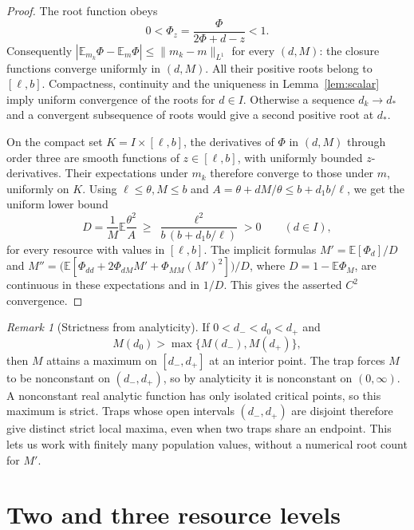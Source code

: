 \documentclass[11pt]{article}
\theoremstyle{remark}
\newtheorem{remark}[theorem]{Remark}
\newcommand{\E}{\mathbb E}
\begin{document}
\begin{proof}
The root function obeys
\[
 0<\Phi_z=\frac{\Phi}{2\Phi+d-z}<1.
\]
Consequently \(|\E_{m_k}\Phi-\E_m\Phi|\le\|m_k-m\|_{L^1}\) for every
\((d,M)\): the closure functions converge uniformly in \((d,M)\). All
their positive roots belong to \([\ell,b]\). Compactness, continuity and
the uniqueness in Lemma~\ref{lem:scalar} imply uniform convergence of the
roots for \(d\in I\). Otherwise a sequence \(d_k\to d_*\) and a convergent
subsequence of roots would give a second positive root at \(d_*\).

On the compact set \(K=I\times[\ell,b]\), the derivatives of \(\Phi\) in
\((d,M)\) through order three are smooth functions of \(z\in[\ell,b]\),
with uniformly bounded \(z\)-derivatives. Their expectations under \(m_k\)
therefore converge to those under \(m\), uniformly on \(K\). Using
\(\ell\le\theta,M\le b\) and \(A=\theta+dM/\theta\le b+d_1b/\ell\), we get
the uniform lower bound
\begin{equation}\label{eq:D-lower}
 D=\frac1M\E\frac{\theta^2}{A}\ \ge\ \frac{\ell^2}{b\,(b+d_1b/\ell)}>0
 \qquad (d\in I),
\end{equation}
for every resource with values in \([\ell,b]\). The implicit formulas
\(M'=\E[\Phi_d]/D\) and
\(M''=\bigl(\E[\Phi_{dd}+2\Phi_{dM}M'+\Phi_{MM}(M')^2]\bigr)/D\),
where \(D=1-\E\Phi_M\), are continuous in these expectations and in
\(1/D\). This gives the asserted \(C^2\) convergence.
\end{proof}

\begin{remark}[Strictness from analyticity]\label{rem:trapping}
If \(0<d_-<d_0<d_+\) and
\[
 M(d_0)>\max\{M(d_-),M(d_+)\},
\]
then \(M\) attains a maximum on \([d_-,d_+]\) at an interior point. The
trap forces \(M\) to be nonconstant on \((d_-,d_+)\), so by analyticity it
is nonconstant on \((0,\infty)\). A nonconstant real analytic function has
only isolated critical points, so this maximum is strict. Traps whose open
intervals \((d_-,d_+)\) are disjoint therefore give distinct strict local
maxima, even when two traps share an endpoint. This lets us work with
finitely many population values, without a numerical root count for
\(M'\).
\end{remark}

\section{Two and three resource levels}\label{sec:two-three}
\end{document}
